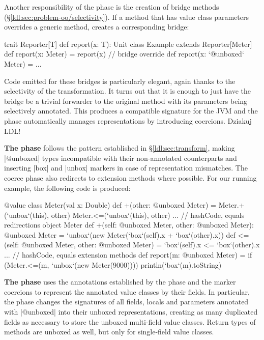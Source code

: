 Another responsibility of the \inject{} phase is the creation of bridge methods (\S\ref{ldl:sec:problem-oo/selectivity}). If a method that has value class parameters overrides a generic method, \inject{} creates a corresponding bridge:

\begin{lstlisting-nobreak}
 trait Reporter[T] {
   def report(x: T): Unit
 }
 class Example extends Reporter[Meter] {
   def report(x: Meter) = report(x) // bridge
   override def report(x: `@unboxed` Meter) = ...
 }
\end{lstlisting-nobreak}

Code emitted for these bridges is particularly elegant, again thanks to the selectivity of the transformation. It turns out that it is enough to just have the bridge be a trivial forwarder to the original method with its parameters being selectively annotated. This produces a compatible signature for the JVM and the \coerce{} phase automatically manages representations by introducing coercions. Dziakuj LDL!

\textbf{The \coerce{} phase} follows the pattern established in \S\ref{ldl:sec:transform}, making |@unboxed| types incompatible with their non-annotated counterparts and inserting |box| and |unbox| markers in case of representation mismatches. The coerce phase also redirects to extension methods where possible. For our running example, the following code is produced:

\begin{lstlisting-nobreak}
 @value class Meter(val x: Double) {
   def +(other: @unboxed Meter) =
     Meter.+(`unbox`(this), other)
     Meter.<=(`unbox`(this), other)
   ... // hashCode, equals redirections
 }
 object Meter {
   def +(self: @unboxed Meter, other: @unboxed Meter): @unboxed Meter = `unbox`(new Meter(`box`(self).x + `box`(other).x))
   def <=(self: @unboxed Meter, other: @unboxed Meter) = `box`(self).x <= `box`(other).x
   ... // hashCode, equals extension methods
 }
 def report(m: @unboxed Meter) = {
   if (Meter.<=(m, `unbox`(new Meter(9000))))
     println(`box`(m).toString)
 }
\end{lstlisting-nobreak}

\textbf{The \commit{} phase} uses the annotations established by the \inject{} phase and the marker coercions to represent the annotated value classes by their fields. In particular, the \commit{} phase changes the signatures of all fields, locals and parameters annotated with |@unboxed| into their unboxed representations, creating as many duplicated fields as necessary to store the unboxed multi-field value classes. Return types of methods are unboxed as well, but only for single-field value classes.

